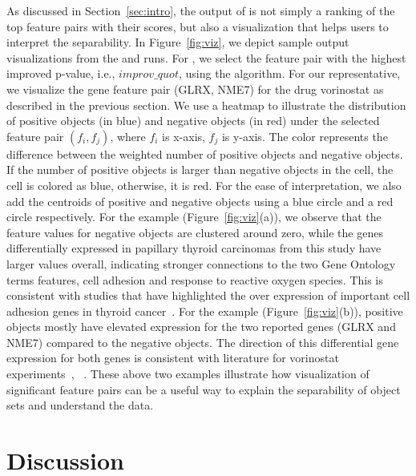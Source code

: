 As discussed in Section~\ref{sec:intro}, the output of \genviz is not simply a ranking of the top feature pairs with their scores, but also a visualization that helps users to interpret the separability. In Figure~\ref{fig:viz}, we depict sample output visualizations from the \msig and \lincs runs. For \msig, we select the feature pair with the highest improved p-value, i.e., $improv\_quot$, using the \sampOpt algorithm. For our \lincs representative, we visualize the gene feature pair (GLRX, NME7) for the drug vorinostat as described in the previous section. We use a heatmap to illustrate the distribution of positive objects (in blue) and negative objects (in red) under the selected feature pair $(f_i,f_j)$, where $f_i$ is x-axis, $f_j$ is y-axis. The color represents the difference between the weighted number of positive objects and negative objects. If the number of positive objects is larger than negative objects in the cell, the cell is colored as blue, otherwise, it is red. For the ease of interpretation, we also add the centroids of positive and negative objects using a blue circle and a red circle respectively. For the \msig example (Figure~\ref{fig:viz}(a)), we observe that the feature values for negative objects are clustered around zero, while the genes differentially expressed in papillary thyroid carcinomas from this \msig study have larger values overall, indicating stronger connections to the two Gene Ontology terms features, cell adhesion and response to reactive oxygen species. This is consistent with studies that have highlighted the over expression of important cell adhesion genes in thyroid cancer~\cite{gorka2007nrcam}. For the \lincs example (Figure~\ref{fig:viz}(b)), positive objects mostly have elevated expression for the two reported genes (GLRX and NME7) compared to the negative objects. The direction of this differential gene expression for both genes is consistent with literature for vorinostat experiments~\cite{qi2014systematic}, ~\cite{soldi2013genomic}. These above two examples illustrate how visualization of significant feature pairs can be a useful way to explain the separability of object sets and understand the data.


\section{Discussion}\label{sec:disc}

